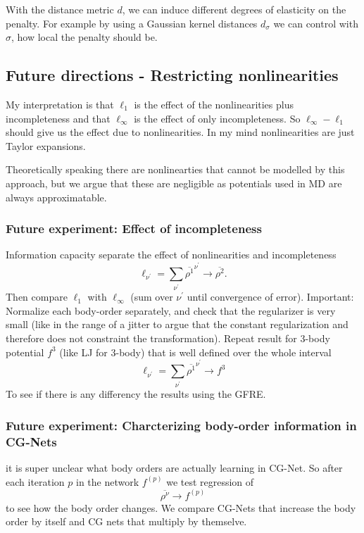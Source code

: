 With the distance metric $d$, we can induce different degrees of elasticity on the penalty.
For example by using a Gaussian kernel distances $d_\sigma$ we can control with $\sigma$, how local the penalty should be.

\subsection{Future directions - Restricting nonlinearities}

My interpretation is that $\ell_1$ is the effect of the nonlinearities plus incompleteness and that $\ell_\infty$ is the effect of only incompleteness.
So $\ell_\infty - \ell_1$ should give us the effect due to nonlinearities.
In my mind nonlinearities are just Taylor expansions.


Theoretically speaking there are nonlinearties that cannot be modelled by this approach, but we argue that these are negligible as potentials used in MD are always approximatable.

\subsubsection{Future experiment: Effect of incompleteness}
Information capacity separate the effect of nonlinearities and incompleteness
\[\ell_{\nu^\prime} = \sum_{\nu^\prime} \overline{\rho^1}^{\nu^\prime} \rightarrow \overline{\rho^{2}}.\]
Then compare $\ell_1$ with $\ell_\infty$ (sum over $\nu^\prime$ until convergence of error).
Important: Normalize each body-order separately, and check that the regularizer is very small (like in the range of a jitter to argue that the constant regularization and therefore does not constraint the transformation).
Repeat result for 3-body potential $f^3$ (like LJ for 3-body) that is well defined over the whole interval
\[\ell_{\nu^\prime} = \sum_{\nu^\prime} \overline{\rho^1}^{\nu^\prime} \rightarrow f^3\]
To see if there is any differency the results using the GFRE.

\subsubsection{Future experiment: Charcterizing body-order information in CG-Nets}
it is super unclear what body orders are actually learning in CG-Net.
So after each iteration $p$ in the network $f^{(p)}$ we test regression of
\[\overline{\rho^\nu} \rightarrow f^{(p)}\]
to see how the body order changes.
We compare CG-Nets that increase the body order by itself and CG nets that multiply by themselve.



